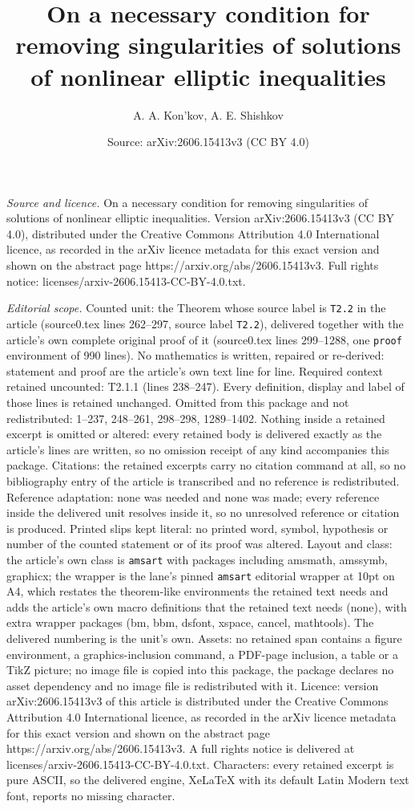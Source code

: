 \documentclass[10pt,a4paper]{amsart}
\title[On a necessary condition for removing singularities of solut]{On a necessary condition for removing singularities of solutions of nonlinear elliptic inequalities}
\author{A. A. Kon'kov, A. E. Shishkov}
\date{Source: arXiv:2606.15413v3 (CC BY 4.0)}
\begin{document}
\maketitle

\noindent\emph{Source and licence.} On a necessary condition for removing singularities of solutions of nonlinear elliptic inequalities. Version arXiv:2606.15413v3 (CC BY 4.0), distributed under the Creative Commons Attribution 4.0 International licence, as recorded in the arXiv licence metadata for this exact version and shown on the abstract page https://arxiv.org/abs/2606.15413v3. Full rights notice: licenses/arxiv-2606.15413-CC-BY-4.0.txt.\par\smallskip

\noindent\textit{Editorial scope.} Counted unit: the Theorem whose source label is \texttt{T2.2} in the article (source0.tex lines 262--297, source label \texttt{T2.2}), delivered together with the article's own complete original proof of it (source0.tex lines 299--1288, one \texttt{proof} environment of 990 lines). No mathematics is written, repaired or re-derived: statement and proof are the article's own text line for line. Required context retained uncounted: T2.1.1 (lines 238--247). Every definition, display and label of those lines is retained unchanged. Omitted from this package and not redistributed: 1--237, 248--261, 298--298, 1289--1402. Nothing inside a retained excerpt is omitted or altered: every retained body is delivered exactly as the article's lines are written, so no omission receipt of any kind accompanies this package. Citations: the retained excerpts carry no citation command at all, so no bibliography entry of the article is transcribed and no reference is redistributed. Reference adaptation: none was needed and none was made; every reference inside the delivered unit resolves inside it, so no unresolved reference or citation is produced. Printed slips kept literal: no printed word, symbol, hypothesis or number of the counted statement or of its proof was altered. Layout and class: the article's own class is \texttt{amsart} with packages including amsmath, amssymb, graphicx; the wrapper is the lane's pinned \texttt{amsart} editorial wrapper at 10pt on A4, which restates the theorem-like environments the retained text needs and adds the article's own macro definitions that the retained text needs (none), with extra wrapper packages (bm, bbm, dsfont, xspace, cancel, mathtools). The delivered numbering is the unit's own. Assets: no retained span contains a figure environment, a graphics-inclusion command, a PDF-page inclusion, a table or a TikZ picture; no image file is copied into this package, the package declares no asset dependency and no image file is redistributed with it. Licence: version arXiv:2606.15413v3 of this article is distributed under the Creative Commons Attribution 4.0 International licence, as recorded in the arXiv licence metadata for this exact version and shown on the abstract page https://arxiv.org/abs/2606.15413v3. A full rights notice is delivered at licenses/arxiv-2606.15413-CC-BY-4.0.txt. Characters: every retained excerpt is pure ASCII, so the delivered engine, XeLaTeX with its default Latin Modern text font, reports no missing character.
\end{document}

